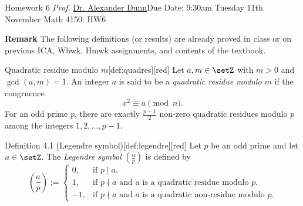 \newpage{}
{Homework 6}
{\textit{Prof.} \href{https://alexjdunn.weebly.com/}{Dr. Alexander Dunn}}{Due Date: 9:30am Tuesday 11th November}
{Math 4150: HW6}










\newpage

\textbf{Remark} The following definitions (or results) are already proved in class or on previous ICA, Wbwk, Hmwk assignments, and contents of the textbook.


\begin{define}{Quadratic residue modulo $m$}[def:quadres][red]
Let $a,m\in\setZ$ with $m>0$ and $\gcd(a,m)=1$. An integer $a$ is said to be a
\emph{quadratic residue modulo $m$} if the congruence
\[
x^2 \equiv a \pmod{n}.
\]
For an odd prime $p$, there are exactly $\frac{p-1}{2}$ non-zero quadratic residues modulo $p$ among the integers $1, 2, \ldots, p-1$.
\end{define}


\begin{define}{Definition 4.1 (Legendre symbol)}[def:legendre][red]
Let $p$ be an odd prime and let $a\in\setZ$. The \emph{Legendre symbol} $(\tfrac{a}{p})$ is defined by
\[
\left(\frac{a}{p}\right):=
\begin{cases}
0, & \text{if } p\mid a,\\[4pt]
1, & \text{if } p\nmid a\text{ and } a \text{ is a quadratic residue modulo } p,\\[4pt]
-1,& \text{if } p\nmid a\text{ and } a \text{ is a quadratic non-residue modulo } p.
\end{cases}
\]
\end{define}




